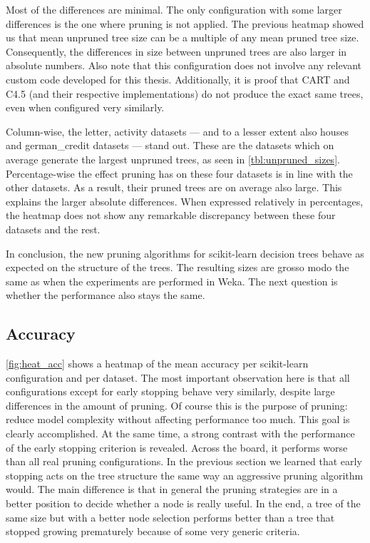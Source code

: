 Most of the differences are minimal. The only configuration with some larger differences is the one where pruning is not applied. The previous heatmap showed us that mean unpruned tree size can be a multiple of any mean pruned tree size. Consequently, the differences in size between unpruned trees are also larger in absolute numbers. Also note that this configuration does not involve any relevant custom code developed for this thesis. Additionally, it is proof that CART and C4.5 (and their respective implementations) do not produce the exact same trees, even when configured very similarly.

Column-wise, the letter, activity datasets --- and to a lesser extent also houses and german\_credit datasets --- stand out. These are the datasets which on average generate the largest unpruned trees, as seen in \autoref{tbl:unpruned_sizes}. Percentage-wise the effect pruning has on these four datasets is in line with the other datasets. As a result, their pruned trees are on average also large. This explains the larger absolute differences. When expressed relatively in percentages, the heatmap does not show any remarkable discrepancy between these four datasets and the rest.

In conclusion, the new pruning algorithms for scikit-learn decision trees behave as expected on the structure of the trees. The resulting sizes are grosso modo the same as when the experiments are performed in Weka. The next question is whether the performance also stays the same.

\subsection{Accuracy}
\autoref{fig:heat_acc} shows a heatmap of the mean accuracy per scikit-learn configuration and per dataset. The most important observation here is that all configurations except for early stopping behave very similarly, despite large differences in the amount of pruning. Of course this is the purpose of pruning: reduce model complexity without affecting performance too much. This goal is clearly accomplished. At the same time, a strong contrast with the performance of the early stopping criterion is revealed. Across the board, it performs worse than all real pruning configurations. In the previous section we learned that early stopping acts on the tree structure the same way an aggressive pruning algorithm would. The main difference is that in general the pruning strategies are in a better position to decide whether a node is really useful. In the end, a tree of the same size but with a better node selection performs better than a tree that stopped growing prematurely because of some very generic criteria.

